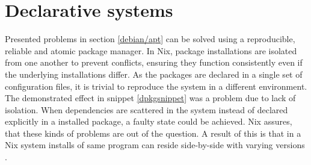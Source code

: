 



\section{Declarative systems} \label{declarativesystems}

Presented problems in section \ref{debian/apt} can be solved using a
reproducible, reliable and atomic package manager. In Nix, package
installations are isolated from one another to prevent conflicts,
ensuring they function consistently even if the underlying
installations differ. As the packages are declared in a single set of
configuration files, it is trivial to reproduce the system in a
different environment. The demonstrated effect in snippet
\ref{dpkgsnippet} was a problem due to lack of isolation. When
dependencies are scattered in the system instead of declared
explicitly in a installed package, a faulty state could be
achieved. Nix assures, that these kinds of problems are out of the
question. A result of this is that in a Nix system installs of same
program can reside side-by-side with varying versions
\cite{dolstra2008nixos}.

